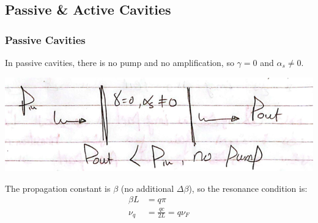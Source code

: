 \documentclass[11pt]{article}
\begin{document}
\subsection{Passive \& Active Cavities}

\subsubsection{Passive Cavities}

In passive cavities, there is no pump and no amplification, so $\gamma = 0$ and $\alpha_s \neq 0$.
\begin{center}
    \includegraphics[scale=0.8]{1.png}
\end{center}
The propagation constant is $\beta$ (no additional $\Delta \beta$), so the resonance condition is:
\begin{align*}
    \beta L &= q \pi  \\
    \nu_q &= \frac{qc}{2L} = q \nu_F
\end{align*}
\end{document}

